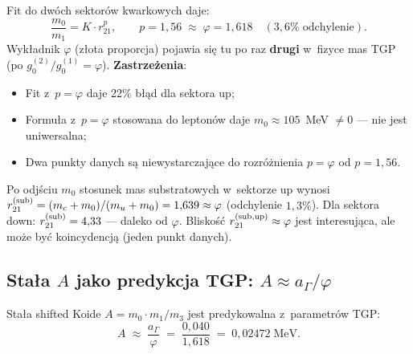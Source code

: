 \begin{result}%
\label{res:X-power-scaling}
Fit do dw\'och sektor\'ow kwarkowych daje:
\begin{equation}\label{eq:X-power-scaling}
  \frac{m_0}{m_1} = K \cdot r_{21}^{p},
  \qquad p = 1{,}56 \;\approx\; \varphi = 1{,}618
  \quad (3{,}6\%\;\text{odchylenie}).
\end{equation}
Wyk\l{}adnik $\varphi$ (z\l{}ota proporcja) pojawia si\k{e} tu
po raz \textbf{drugi} w~fizyce mas TGP (po $g_0^{(2)}/g_0^{(1)} = \varphi$).
\textbf{Zastrze\.zenia}:
\begin{itemize}[nosep]
  \item Fit z~$p = \varphi$ daje 22\% b\l{}\k{a}d dla sektora up;
  \item Formu\l{}a z~$p = \varphi$ stosowana do lepton\'ow daje
        $m_0 \approx 105$~MeV $\neq 0$ --- nie jest uniwersalna;
  \item Dwa punkty danych s\k{a} niewystarczaj\k{a}ce
        do rozr\'o\.znienia $p = \varphi$ od $p = 1{,}56$.
\end{itemize}
\end{result}

\begin{remark}\label{rem:X-substrate-ratio-up}
Po odjściu $m_0$ stosunek mas substratowych w~sektorze up wynosi
$r_{21}^{\rm (sub)} = (m_c + m_0)/(m_u + m_0) = 1{,}639 \approx \varphi$
(odchylenie $1{,}3\%$).
Dla sektora down: $r_{21}^{\rm (sub)} = 4{,}33$ --- daleko od $\varphi$.
Blisko\'s\'c $r_{21}^{\rm (sub, up)} \approx \varphi$ jest interesuj\k{a}ca,
ale mo\.ze by\'c koincydencj\k{a} (jeden punkt danych).
\end{remark}

\subsection{Sta\l{}a $A$ jako predykcja TGP: $A \approx a_\Gamma/\varphi$}%
\label{app:X-A-prediction}

\begin{proposition}%
\label{prop:X-A-agamma-phi}
Stała shifted Koide $A = m_0 \cdot m_1/m_3$ jest predykowalna
z~parametr\'ow TGP:
\begin{equation}\label{eq:X-A-prediction}
  \boxed{
    A \;\approx\; \frac{a_\Gamma}{\varphi}
    \;=\; \frac{0{,}040}{1{,}618}
    \;=\; 0{,}02472 \;\text{MeV}.
  }
\end{equation}
\end{proposition}

